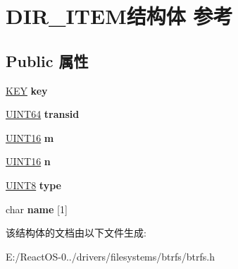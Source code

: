 \hypertarget{struct_d_i_r___i_t_e_m}{}\section{D\+I\+R\+\_\+\+I\+T\+E\+M结构体 参考}
\label{struct_d_i_r___i_t_e_m}
\subsection*{Public 属性}
\begin{DoxyCompactItemize}
\item 
\mbox{\label{struct_d_i_r___i_t_e_m_ae75bd5afc80dbefc24575a744f248272}} 
\hyperlink{struct_k_e_y}{K\+EY} {\bfseries key}
\item 
\mbox{\label{struct_d_i_r___i_t_e_m_aef9ae2994e5b5b29f9f3cdef44e1c815}} 
\hyperlink{_processor_bind_8h_a57be03562867144161c1bfee95ca8f7c}{U\+I\+N\+T64} {\bfseries transid}
\item 
\mbox{\label{struct_d_i_r___i_t_e_m_a6e202d957577529ebd6ae81ac98b9f9a}} 
\hyperlink{_processor_bind_8h_a09f1a1fb2293e33483cc8d44aefb1eb1}{U\+I\+N\+T16} {\bfseries m}
\item 
\mbox{\label{struct_d_i_r___i_t_e_m_ac0a39210bd3b6098a1264eff8a775e8b}} 
\hyperlink{_processor_bind_8h_a09f1a1fb2293e33483cc8d44aefb1eb1}{U\+I\+N\+T16} {\bfseries n}
\item 
\mbox{\label{struct_d_i_r___i_t_e_m_abd90b5c2e5f582c7057f0faf0534df9e}} 
\hyperlink{_processor_bind_8h_ab27e9918b538ce9d8ca692479b375b6a}{U\+I\+N\+T8} {\bfseries type}
\item 
\mbox{\label{struct_d_i_r___i_t_e_m_ab5dae8879472cfcb0486752d1e8d1ae4}} 
char {\bfseries name} \mbox{[}1\mbox{]}
\end{DoxyCompactItemize}


该结构体的文档由以下文件生成\+:\begin{DoxyCompactItemize}
\item 
E\+:/\+React\+O\+S-\/0../drivers/filesystems/btrfs/btrfs.\+h\end{DoxyCompactItemize}
